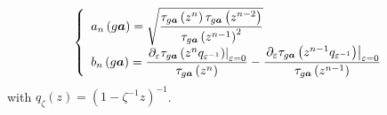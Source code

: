\documentclass[a4paper]{article}%
\begin{document}
\begin{equation}
\left\{
\begin{array}
[c]{l}%
a_{n}\left(  g\boldsymbol{a}\right)  =\sqrt{\dfrac{\tau_{g\boldsymbol{a}%
}\left(  z^{n}\right)  \tau_{g\boldsymbol{a}}\left(  z^{n-2}\right)  }%
{\tau_{g\boldsymbol{a}}\left(  z^{n-1}\right)  ^{2}}}\\
b_{n}\left(  g\boldsymbol{a}\right)  =\dfrac{\left.  \partial_{\varepsilon
}\tau_{g\boldsymbol{a}}\left(  z^{n}q_{\varepsilon^{-1}}\right)  \right\vert
_{\varepsilon=0}}{\tau_{g\boldsymbol{a}}\left(  z^{n}\right)  }-\dfrac{\left.
\partial_{\varepsilon}\tau_{g\boldsymbol{a}}\left(  z^{n-1}q_{\varepsilon
^{-1}}\right)  \right\vert _{\varepsilon=0}}{\tau_{g\boldsymbol{a}}\left(
z^{n-1}\right)  }%
\end{array}
\right.  \label{1-13}%
\end{equation}
with $q_{\zeta}\left(  z\right)  =\left(  1-\zeta^{-1}z\right)  ^{-1}$.
\end{document}
